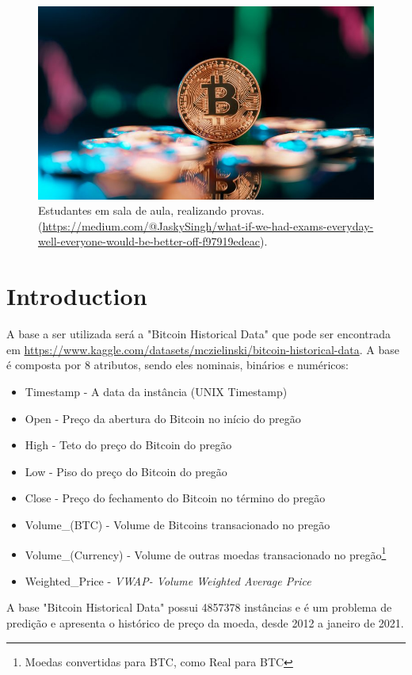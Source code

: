 \documentclass[sigplan,screen]{acmart}
\begin{document}
\begin{figure}[h]
  \centering
  \includegraphics[width=\linewidth]{btc.jpg}
  \caption{Estudantes em sala de aula, realizando provas. (\url{https://medium.com/@JaskySingh/what-if-we-had-exams-everyday-well-everyone-would-be-better-off-f97919edeac}).}
\end{figure}



\section{Introduction}
A base a ser utilizada será a "Bitcoin Historical Data" que pode ser encontrada em \url{https://www.kaggle.com/datasets/mczielinski/bitcoin-historical-data}.
A base é composta por 8 atributos, sendo eles nominais, binários e numéricos:
\begin{itemize}
    \item Timestamp - A data da instância (UNIX Timestamp) 
    \item Open - Preço da abertura do Bitcoin no início do pregão
    \item High - Teto do preço do Bitcoin do pregão
    \item Low - Piso do preço do Bitcoin do pregão
    \item Close - Preço do fechamento do Bitcoin no término do pregão
    \item Volume\_(BTC) - Volume de Bitcoins transacionado no pregão
    \item Volume\_(Currency) - Volume de outras moedas transacionado no pregão\footnote{Moedas convertidas para BTC, como Real para BTC}
    \item Weighted\_Price - \textit{VWAP- Volume Weighted Average Price}
\end{itemize}

A base "Bitcoin Historical Data" possui 4857378 instâncias e é um problema de predição e apresenta o histórico de preço da moeda, desde 2012 a janeiro de 2021.










\end{document}
